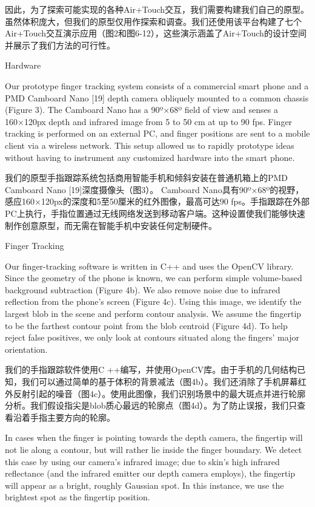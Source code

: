因此，为了探索可能实现的各种Air+Touch交互，我们需要构建我们自己的原型。虽然体积庞大，但我们的原型仅用作探索和调查。我们还使用该平台构建了七个Air+Touch交互演示应用（图2和图6-12），这些演示涵盖了Air+Touch的设计空间并展示了我们方法的可行性。

Hardware

Our prototype finger tracking system consists of a commercial smart phone and a PMD Camboard Nano [19] depth camera obliquely mounted to a common chassis (Figure 3). The Camboard Nano has a 90º×68º field of view and senses a 160×120px depth and infrared image from 5 to 50 cm at up to 90 fps. Finger tracking is performed on an external PC, and finger positions are sent to a mobile client via a wireless network. This setup allowed us to rapidly prototype ideas without having to instrument any customized hardware into the smart phone. 

我们的原型手指跟踪系统包括商用智能手机和倾斜安装在普通机箱上的PMD Camboard Nano [19]深度摄像头（图3）。 Camboard Nano具有90º×68º的视野，感应160×120px的深度和5至50厘米的红外图像，最高可达90 fps。手指跟踪在外部PC上执行，手指位置通过无线网络发送到移动客户端。这种设置使我们能够快速制作创意原型，而无需在智能手机中安装任何定制硬件。

Finger Tracking

Our finger-tracking software is written in C++ and uses the OpenCV library. Since the geometry of the phone is known, we can perform simple volume-based background subtraction (Figure 4b). We also remove noise due to infrared reflection from the phone’s screen (Figure 4c). Using this image, we identify the largest blob in the scene and perform contour analysis. We assume the fingertip to be the farthest contour point from the blob centroid (Figure 4d). To help reject false positives, we only look at contours situated along the fingers’ major orientation.

我们的手指跟踪软件使用C ++编写，并使用OpenCV库。由于手机的几何结构已知，我们可以通过简单的基于体积的背景减法（图4b）。我们还消除了手机屏幕红外反射引起的噪音（图4c）。使用此图像，我们识别场景中的最大斑点并进行轮廓分析。我们假设指尖是blob质心最远的轮廓点（图4d）。为了防止误报，我们只查看沿着手指主要方向的轮廓。

In cases when the finger is pointing towards the depth camera, the fingertip will not lie along a contour, but will rather lie inside the finger boundary. We detect this case by using our camera’s infrared image; due to skin’s high infrared reflectance (and the infrared emitter our depth camera employs), the fingertip will appear as a bright, roughly Gaussian spot. In this instance, we use the brightest spot as the fingertip position. 



